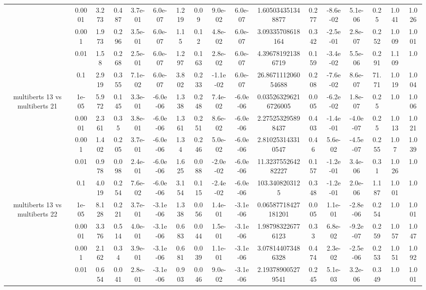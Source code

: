 \begin{tabular}{|c|c|c|c|c|c|c|c|c|c|c|c|c|c|c|c|c|}
 & 0.0001 & 3.273 & 0.487 & 3.7e-01 & 6.0e-07 & 1.219 & 0.09 & 9.0e-02 & 6.0e-07 & 1.605034351348877 & 0.277 & -8.6e-02 & 5.1e-06 & 0.25 & 1.041 & 1.026 \\
 & 0.001 & 1.973 & 0.296 & 3.5e-01 & 6.0e-07 & 1.15 & 0.12 & 4.8e-02 & 6.0e-07 & 3.09335708618164 & 0.342 & -2.5e-01 & 2.8e-07 & 0.252 & 1.009 & 1.001 \\
 & 0.01 & 1.58 & 0.268 & 2.5e-01 & 6.0e-07 & 1.297 & 0.163 & 2.8e-02 & 6.0e-07 & 4.396781921386719 & 0.159 & -3.4e-02 & 5.5e-06 & 0.291 & 1.109 & 1.0 \\
 & 0.1 & 2.919 & 0.355 & 7.1e-02 & 6.0e-07 & 3.802 & 0.233 & -1.1e-02 & 6.0e-07 & 26.867111206054688 & 0.208 & -7.6e-02 & 8.6e-07 & 71.71 & 1.019 & 1.004 \\
\hline
\multirow{5}{*}{multiberts 13 vs multiberts 21} & 1e-05 & 5.972 & 0.145 & 3.3e-01 & -6.0e-06 & 1.338 & 0.248 & 7.4e-02 & -6.0e-06 & 0.035263296216726005 & 0.005 & -6.2e-02 & 1.8e-07 & 0.25 & 1.0 & 1.006 \\
 & 0.0001 & 2.361 & 0.35 & 3.8e-01 & -6.0e-06 & 1.361 & 0.251 & 8.6e-02 & -6.0e-06 & 2.275253295898437 & 0.403 & -1.4e-01 & -4.0e-07 & 0.25 & 1.013 & 1.021 \\
 & 0.001 & 1.402 & 0.205 & 3.7e-01 & -6.0e-06 & 1.34 & 0.246 & 5.0e-02 & -6.0e-06 & 2.810253143310547 & 0.46 & 5.6e-02 & -4.5e-07 & 0.255 & 1.07 & 1.039 \\
 & 0.01 & 0.978 & 0.098 & 2.4e-01 & -6.0e-06 & 1.625 & 0.088 & -2.0e-02 & -6.0e-06 & 11.323755264282227 & 0.157 & -1.2e-01 & 3.4e-06 & 0.31 & 1.026 & 1.0 \\
 & 0.1 & 4.019 & 0.254 & 7.6e-02 & -6.0e-06 & 3.154 & 0.115 & -2.4e-02 & -6.0e-06 & 103.3408203125 & 0.348 & -1.2e-01 & 2.0e-06 & 1.187 & 1.001 & 1.0 \\
\hline
\multirow{5}{*}{multiberts 13 vs multiberts 22} & 1e-05 & 8.128 & 0.221 & 3.7e-01 & -3.1e-06 & 1.338 & 0.056 & 1.4e-01 & -3.1e-06 & 0.06587718427181201 & 0.005 & 1.1e-01 & -2.8e-06 & 0.254 & 1.0 & 1.001 \\
 & 0.0001 & 3.376 & 0.514 & 4.0e-01 & -3.1e-06 & 0.683 & 0.044 & 1.5e-01 & -3.1e-06 & 1.987983226776123 & 0.33 & 6.8e-02 & -9.2e-07 & 0.259 & 1.057 & 1.047 \\
 & 0.001 & 2.162 & 0.34 & 3.9e-01 & -3.1e-06 & 0.681 & 0.039 & 1.1e-01 & -3.1e-06 & 3.078144073486328 & 0.474 & 2.3e-02 & -2.5e-06 & 0.253 & 1.051 & 1.092 \\
 & 0.01 & 0.654 & 0.041 & 2.8e-01 & -3.1e-06 & 0.903 & 0.046 & 9.0e-02 & -3.1e-06 & 2.193789005279541 & 0.245 & 5.1e-03 & 3.2e-06 & 0.349 & 1.0 & 1.001 \\

\end{tabular}
